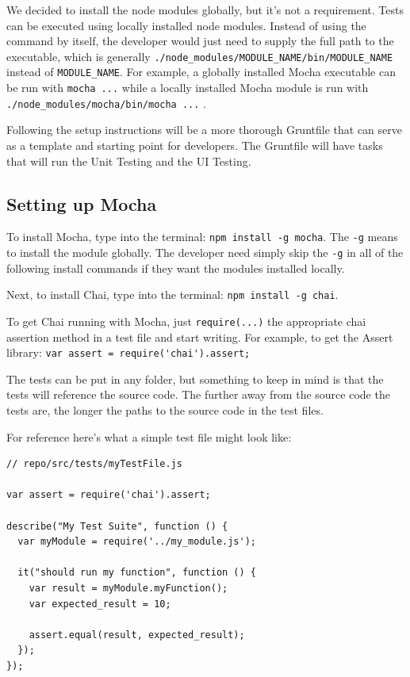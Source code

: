\documentclass[12pt]{ucthesis}
\begin{document}
We decided to install the node modules globally, but it's not a requirement. Tests can be executed using locally installed node modules. Instead of using the command by itself, the developer would just need to supply the full path to the executable, which is generally \lstinline{./node_modules/MODULE_NAME/bin/MODULE_NAME} \space instead of \lstinline{MODULE_NAME}. For example, a globally installed Mocha executable can be run with \lstinline{mocha ...} while a locally installed Mocha module is run with \lstinline{./node_modules/mocha/bin/mocha ...} \space .

Following the setup instructions will be a more thorough Gruntfile that can serve as a template and starting point for developers. The Gruntfile will have tasks that will run the Unit Testing and the UI Testing.

\subsection{Setting up Mocha}
To install Mocha, type into the terminal: \lstinline{npm install -g mocha}. The \lstinline{-g} means to install the module globally. The developer need simply skip the \lstinline{-g} in all of the following install commands if they want the modules installed locally.

Next, to install Chai, type into the terminal: \lstinline{npm install -g chai}.

To get Chai running with Mocha, just \lstinline{require(...)} the appropriate chai assertion method in a test file and start writing. For example, to get the Assert library: \lstinline{var assert = require('chai').assert;}

The tests can be put in any folder, but something to keep in mind is that the tests will reference the source code. The further away from the source code the tests are, the longer the paths to the source code in the test files.

For reference here's what a simple test file might look like:
\begin{lstlisting}
// repo/src/tests/myTestFile.js

var assert = require('chai').assert;

describe("My Test Suite", function () {
  var myModule = require('../my_module.js');

  it("should run my function", function () {
    var result = myModule.myFunction();
    var expected_result = 10;

    assert.equal(result, expected_result);
  });
});
\end{lstlisting}
\end{document}
